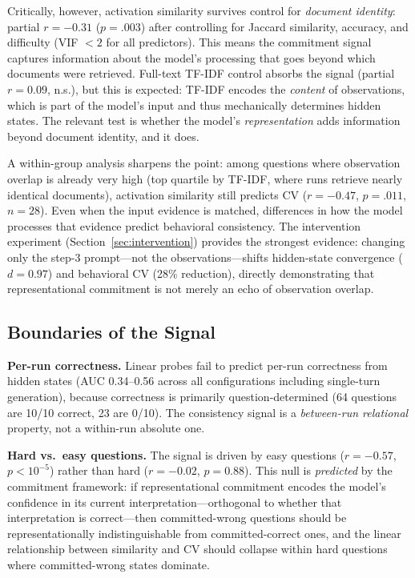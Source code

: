\documentclass{article}
\begin{document}
Critically, however, activation similarity survives control for \emph{document identity}: partial $r = -0.31$ ($p = .003$) after controlling for Jaccard similarity, accuracy, and difficulty (VIF $< 2$ for all predictors). This means the commitment signal captures information about the model's processing that goes beyond which documents were retrieved. Full-text TF-IDF control absorbs the signal (partial $r = 0.09$, n.s.), but this is expected: TF-IDF encodes the \emph{content} of observations, which is part of the model's input and thus mechanically determines hidden states. The relevant test is whether the model's \emph{representation} adds information beyond document identity, and it does.

A within-group analysis sharpens the point: among questions where observation overlap is already very high (top quartile by TF-IDF, where runs retrieve nearly identical documents), activation similarity still predicts CV ($r = -0.47$, $p = .011$, $n = 28$). Even when the input evidence is matched, differences in how the model processes that evidence predict behavioral consistency. The intervention experiment (Section~\ref{sec:intervention}) provides the strongest evidence: changing only the step-3 prompt---not the observations---shifts hidden-state convergence ($d = 0.97$) and behavioral CV (28\% reduction), directly demonstrating that representational commitment is not merely an echo of observation overlap.

\subsection{Boundaries of the Signal}
\label{sec:boundaries}

\textbf{Per-run correctness.} Linear probes fail to predict per-run correctness from hidden states (AUC 0.34--0.56 across all configurations including single-turn generation), because correctness is primarily question-determined (64 questions are 10/10 correct, 23 are 0/10). The consistency signal is a \emph{between-run relational} property, not a within-run absolute one.

\textbf{Hard vs.\ easy questions.} The signal is driven by easy questions ($r = -0.57$, $p < 10^{-5}$) rather than hard ($r = -0.02$, $p = 0.88$). This null is \emph{predicted} by the commitment framework: if representational commitment encodes the model's confidence in its current interpretation—orthogonal to whether that interpretation is correct—then committed-wrong questions should be representationally indistinguishable from committed-correct ones, and the linear relationship between similarity and CV should collapse within hard questions where committed-wrong states dominate.
\end{document}
